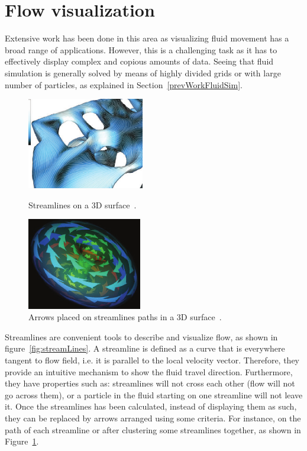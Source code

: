 \section{Flow visualization}
\label{sec:flowVisualization}


Extensive work has been done in this area as visualizing fluid movement has a broad range of applications.
However, this is a challenging task as it has to effectively display complex and copious amounts of data.
Seeing that fluid simulation is generally solved by means of highly divided grids or with large number of particles, as explained in Section~\ref{prevWorkFluidSim}.

\begin{figure}[htbp]
	\centering
	\begin{minipage}[t]{.45\textwidth}
		\centering
		\includegraphics[width=.8\textwidth,height=4cm]{images/streamLinesSpencer}
		\caption{Streamlines on a 3D surface~\cite{Spencer2009}.}
		\label{fig:streamLines}
	\end{minipage}\hfill
	\begin{minipage}[t]{.45\textwidth}
		\centering
		\includegraphics[width=.8\textwidth,height=4cm]{images/streamArrows}
		\caption{Arrows placed on streamlines paths in a 3D surface~\cite{loffelmann1998}.}
		\label{fig:streamArrows}
	\end{minipage}
\end{figure}

Streamlines are convenient tools to describe and visualize flow, as shown in figure~\ref{fig:streamLines}.
A streamline is defined as a curve that is everywhere tangent to flow field, i.e. it is parallel to the local velocity vector.
Therefore, they provide an intuitive mechanism to show the fluid travel direction.
Furthermore, they have properties such as: streamlines will not cross each other (flow will not go across them), or a particle in the fluid starting on one streamline will not leave it.
Once the streamlines has been calculated, instead of displaying them as such, they can be replaced by arrows arranged using some criteria.
For instance, on the path of each streamline or after clustering some streamlines together, as shown in Figure~\ref{fig:streamArrows}.

